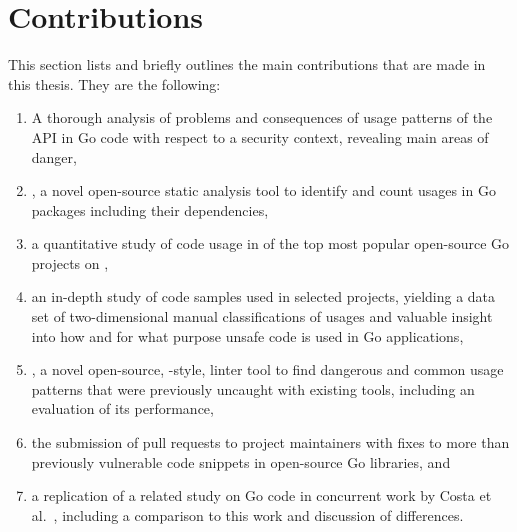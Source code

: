 
\section{Contributions}\label{sec:introduction:contributions}

This section lists and briefly outlines the main contributions that are made in this thesis.
They are the following:

\begin{enumerate}
    \item A thorough analysis of problems and consequences of usage patterns of the \unsafe{} \acrshort{API} in Go code
    with respect to a security context, revealing  main areas of danger,

    \item \toolGeiger, a novel open-source static analysis tool to identify and count \unsafe{} usages in Go packages
    including their dependencies,

    \item a quantitative study of \unsafe{} code usage in \projsAnalyzed{} of the top \projsTotal{} most popular
    open-source Go projects on \github{},

    \item an in-depth study of \numberLabeledCodeSnippets{} code samples used in \projsForLabeledCodeSnippets{} selected
    projects, yielding a data set of two-dimensional manual classifications of usages and valuable insight into how and
    for what purpose unsafe code is used in Go applications,

    \item \toolSafer{}, a novel open-source, \toolVet{}-style, linter tool to find  dangerous and common
    \unsafe{} usage patterns that were previously uncaught with existing tools, including an evaluation of its
    performance,

    \item the submission of \numberPRs{} pull requests to project maintainers with fixes to more than
    \numberBugsFixedRounded{} previously vulnerable code snippets in open-source Go libraries, and

    \item a replication of a related study on \unsafe{} Go code in concurrent work by Costa et al.~\cite{costa2020},
    including a comparison to this work and discussion of differences.
\end{enumerate}



